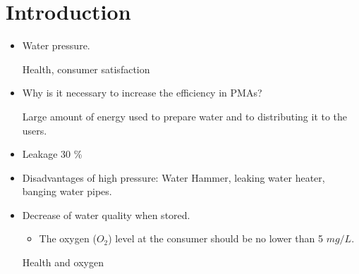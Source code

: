 \chapter{Introduction}

 
\begin{itemize}
\item Water pressure. 

Health, consumer satisfaction
\item Why is it necessary to increase the efficiency in PMAs?

Large amount of energy used to prepare water and to distributing it to the users. 
\item Leakage 30 \%
\item Disadvantages of high pressure: Water Hammer, leaking water heater, banging 
water pipes. %
\item Decrease of water quality when stored. 
\begin{itemize}
\item The oxygen ($O_2$) level at the consumer should be no lower than 5 $mg/L$. 
\end{itemize}
%
Health and oxygen 
\end{itemize}